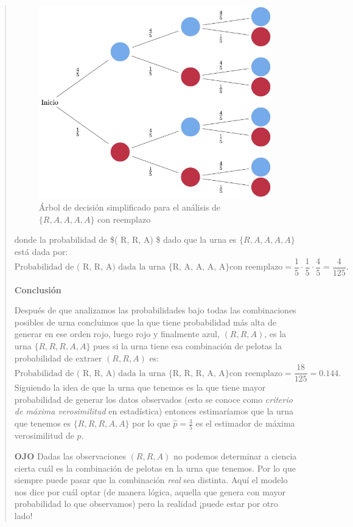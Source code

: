 \documentclass[
]{book}
\begin{document}
\begin{quote}
\begin{figure}
\centering
\includegraphics{./images/arbol_decision_4.jpeg}
\caption{Árbol de decisión simplificado para el análisis de \(\{ R, A, A, A, A\}\) con reemplazo}
\end{figure}

donde la probabilidad de \$( R, R, A) \$ dado que la urna es \(\{ R, A, A, A, A\}\) está dada por:
\[
\textrm{Probabilidad de ( R, R, A) dada la urna \{ R, A, A, A, A\} con reemplazo} = \dfrac{1}{5} \cdot \dfrac{1}{5} \cdot \dfrac{4}{5} = \dfrac{4}{125}.
\]

\textbf{Conclusión}

Después de que analizamos las probabilidades bajo todas las combinaciones posibles de urna concluimos que la que tiene probabilidad más alta de generar en ese orden rojo, luego rojo y finalmente azul, \(( R, R, A)\), es la urna \(\{R, R, R, A, A\}\) pues si la urna tiene esa combinación de pelotas la probabilidad de extraer \(( R, R, A)\) es:
\[
\textrm{Probabilidad de ( R, R, A) dada la urna \{R, R, R, A, A\} con reemplazo} = \dfrac{18}{125} = 0.144.
\]
Siguiendo la idea de que la urna que tenemos es la que tiene mayor probabilidad de generar los datos observados (esto se conoce como \emph{criterio de máxima verosimilitud} en estadística) entonces estimaríamos que la urna que tenemos es \(\{R, R, R, A, A\}\) por lo que \(\hat{p} = \frac{3}{5}\) es el estimador de máxima verosimilitud de \(p\).

\textbf{OJO} Dadas las observaciones \(( R, R, A)\) no podemos determinar a ciencia cierta cuál es la combinación de pelotas en la urna que tenemos. Por lo que siempre puede pasar que la combinación \emph{real} sea distinta. Aquí el modelo nos dice por cuál optar (de manera lógica, aquella que genera con mayor probabilidad lo que observamos) pero la realidad ¡puede estar por otro lado!
\end{quote}
\end{document}
